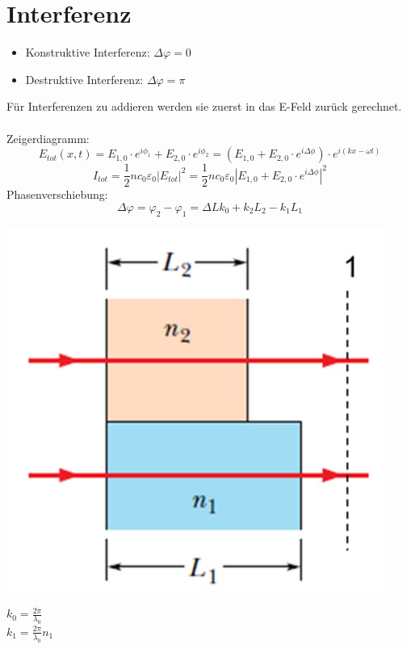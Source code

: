 \section{Interferenz}
\begin{itemize}
	\item Konstruktive Interferenz: $\Delta\varphi=0$
	\item Destruktive Interferenz:  $\Delta\varphi=\pi$\\
\end{itemize}
Für Interferenzen zu addieren werden sie zuerst in das E-Feld zurück gerechnet.
\\
\\
Zeigerdiagramm:
\[
	E_{tot}(x,t)=E_{1,0}\cdot e^{i\phi_1}+E_{2,0}\cdot e^{i\phi_2}= (E_{1,0}+E_{2,0}\cdot e^{i\Delta\phi})\cdot e^{i(kx-\omega t)}
\]
\[
	I_{tot}= \frac{1}{2}nc_0\varepsilon_0|E_{tot}|^2 =
	\frac{1}{2}nc_0\varepsilon_0|E_{1,0}+E_{2,0}\cdot e^{i\Delta \phi}|^2
\]
Phasenverschiebung:
\[
	\Delta\varphi=\varphi_2-\varphi_1= 
	\Delta L k_0+k_2L_2-k_1L_1 
\]
\begin{center}
	\includegraphics[scale = 0.2]{../fig/phasenverschiebung.jpg}
\end{center}
\begin{footnotesize}
	$k_0=\frac{2\pi}{\lambda_0}$\\
	$k_1=\frac{2\pi}{\lambda_0} n_1$\\
\end{footnotesize}
\\
